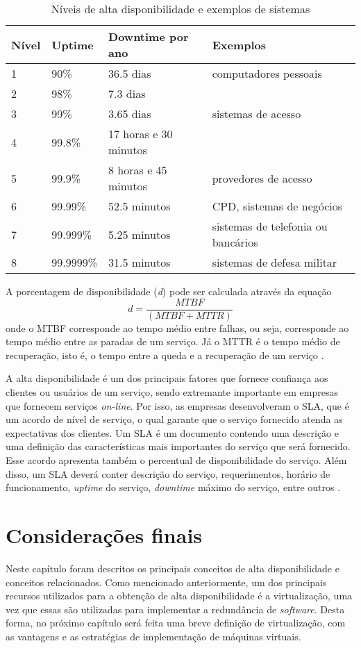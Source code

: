 \begin{table}[h!]
\caption {Níveis de alta disponibilidade e exemplos de sistemas}
\label{tab:dispniveis}
\begin{center}
\begin{tabular}{|l|l|l|l|}\hline
Nível & Uptime & Downtime por ano & Exemplos\\\hline
1 & 90\% & 36.5 dias & computadores pessoais\\\hline
2 & 98\% & 7.3 dias & \\\hline
3 & 99\% & 3.65 dias & sistemas de acesso\\\hline
4 & 99.8\% & 17 horas e 30 minutos & \\\hline
5 & 99.9\% & 8 horas e 45 minutos & provedores de acesso\\\hline
6 & 99.99\% & 52.5 minutos & CPD, sistemas de negócios\\\hline
7 & 99.999\% & 5.25 minutos & sistemas de telefonia ou bancários\\\hline
8 & 99.9999\% & 31.5 minutos & sistemas de defesa militar\\\hline
\end{tabular}
\end{center}
\end{table}

A porcentagem de disponibilidade (\textit{d}) pode ser calculada através da equação
\begin{equation}
d = \frac{MTBF}{(MTBF + MTTR)}
\label{disponibilidade}
\end{equation}
onde o \ac{MTBF} corresponde ao tempo médio entre falhas, ou seja, corresponde ao tempo médio entre as paradas de um serviço. Já o \ac{MTTR} é o 
tempo médio de recuperação, isto é, o tempo entre a queda e a recuperação de um serviço \cite{goncalves2009}.

A alta disponibilidade é um dos principais fatores que fornece confiança aos clientes ou usuários de um serviço, sendo extremante importante 
em empresas que fornecem serviços \textit{on-line}. Por isso, as empresas desenvolveram o \ac{SLA}, que é um acordo de nível de serviço, 
o qual garante que o serviço fornecido atenda as expectativas dos clientes. Um \ac{SLA} é um documento contendo uma descrição e uma definição 
das características mais importantes do serviço que será fornecido. Esse acordo apresenta também o percentual de disponibilidade do serviço.
Além disso, um \ac{SLA} deverá conter descrição do serviço, requerimentos, horário de funcionamento, \textit{uptime} do serviço, 
\textit{downtime} máximo do serviço, entre outros \cite{smith2010}.

\section{Considerações finais}

Neste capítulo foram descritos os principais conceitos de alta disponibilidade e conceitos relacionados. Como mencionado anteriormente, 
um dos principais recursos utilizados para a obtenção de alta disponibilidade é a virtualização, uma vez que essas são utilizadas para 
implementar a redundância de \textit{software}. Desta forma, no próximo capítulo será feita uma breve definição de virtualização, 
com as vantagens e as estratégias de implementação de máquinas virtuais.
